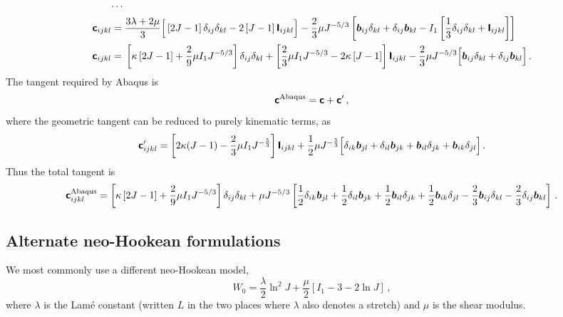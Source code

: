 \documentclass[10pt,letterpaper,oneside]{report}
\newcommand{\ten}[1]{\mbox{\boldmath $#1$}{}}
\newcommand{\tenf}[1]{\mbox{{\sffamily{\bfseries {#1}}}}}
\newcommand{\scas}[1]{\mbox{{\scriptsize{${\rm{#1}}$}}}{}}
\begin{document}
\begin{align}
\cdots{}& \notag \\
\tenf{c}_{ijkl} ={}& \frac{3 \lambda + 2 \mu}{3} \Big[ \left[ 2J - 1 \right] \delta_{ij} \delta_{kl} - 2 \left[ J - 1 \right] \tenf{I}_{ijkl} \Big] - \frac{2}{3} \mu J^{-5/3} \left[ \ten{b}_{ij} \delta_{kl} + \delta_{ij} \ten{b}_{kl} - I_1 \left[ \frac{1}{3} \delta_{ij} \delta_{kl} + \tenf{I}_{ijkl} \right] \right]  
\\
\tenf{c}_{ijkl} ={}& \left[ \kappa \left[ 2J - 1 \right] + \frac{2}{9} \mu I_1 J^{-5/3} \right] \delta_{ij} \delta_{kl} + \left[ \frac{2}{3} \mu I_1 J^{-5/3}  - 2 \kappa \left[ J - 1 \right] \right] \tenf{I}_{ijkl} - \frac{2}{3} \mu J^{-5/3} \Big[ \ten{b}_{ij} \delta_{kl} + \delta_{ij} \ten{b}_{kl} \Big] \, . 
\end{align}
The tangent required by Abaqus is
\begin{equation}
\tenf{c}^{\scas{Abaqus}} = \tenf{c} + \tenf{c}' \, , 
\end{equation}
where the geometric tangent can be reduced to purely kinematic terms, as 
\begin{equation}
\tenf{c}'_{ijkl} = \left[ 2 \kappa (J-1) - \frac{2}{3} \mu I_1 J^{- \frac{5}{3} } \right] \tenf{I}_{ijkl} + \frac{1}{2}\mu J^{- \frac{5}{3} } \Big[ \delta_{ik} \ten{b}_{jl} + \delta_{il} \ten{b}_{jk} + \ten{b}_{il} \delta_{jk} + \ten{b}_{ik} \delta_{jl} \Big] \, . 
\end{equation}
Thus the total tangent is
\begin{equation}
\tenf{c}^{\scas{Abaqus}}_{ijkl} = \left[ \kappa \left[ 2J - 1 \right] + \frac{2}{9} \mu I_1 J^{-5/3} \right] \delta_{ij} \delta_{kl} +\mu J^{-5/3} \left[ \frac{1}{2} \delta_{ik} \ten{b}_{jl} + \frac{1}{2} \delta_{il} \ten{b}_{jk} + \frac{1}{2} \ten{b}_{il} \delta_{jk} + \frac{1}{2} \ten{b}_{ik} \delta_{jl} - \frac{2}{3} \ten{b}_{ij} \delta_{kl} - \frac{2}{3} \delta_{ij} \ten{b}_{kl} \right] \, . 
\end{equation}


\subsection{Alternate neo-Hookean formulations}
We most commonly use a different neo-Hookean model, 
\begin{equation}
W_0 = \frac{\lambda}{2} \ln^2 J + \frac{\mu}{2} \left[ I_1 - 3 - 2 \ln J \right] \, ,
\end{equation}
where $\lambda$ is the Lamé constant (written $L$ in the two places where $\lambda$ also denotes a stretch) and $\mu$ is the shear modulus.
\end{document}
